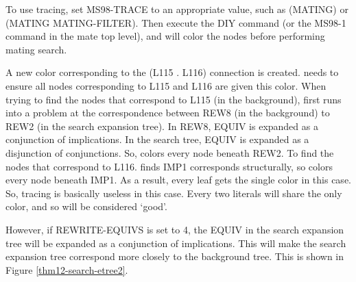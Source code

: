 To use tracing, set MS98-TRACE to an appropriate value,
such as (MATING) or (MATING MATING-FILTER).
Then execute the DIY command (or the MS98-1 command in
the mate top level), and {\TPS} will color the nodes
before performing mating search.

A new color corresponding to the (L115 . L116) connection is created.
{\TPS} needs to ensure all nodes corresponding to L115 and L116 are given this color.
When trying to find the nodes that correspond to L115 (in the background),
{\TPS} first runs into a problem at the correspondence between
REW8 (in the background) to REW2 (in the search expansion tree).  In REW8,
EQUIV is expanded as a conjunction of implications.  In the search
tree, EQUIV is expanded as a disjunction of conjunctions.
So, {\TPS} colors every node beneath REW2.  To find the nodes that correspond
to L116.  {\TPS} finds IMP1 corresponds structurally, so {\TPS} colors every node
beneath IMP1.  As a result, every leaf gets the single color in this case.
So, tracing is basically useless in this case.  Every two literals will
share the only color, and so will be considered `good'.

However, if REWRITE-EQUIVS is set to 4, the EQUIV in the search expansion tree
will be expanded as a conjunction of implications.  This will make
the search expansion tree correspond more closely to the background tree.
This is shown in Figure \ref{thm12-search-etree2}.

